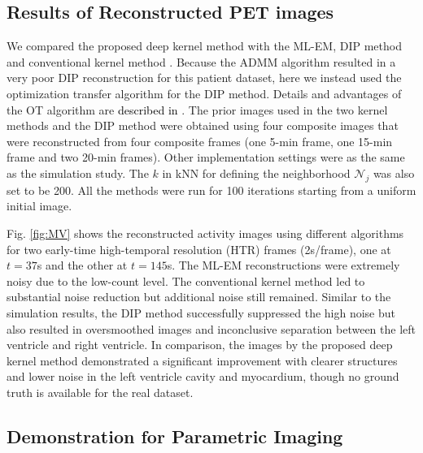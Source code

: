 \documentclass[]{IEEETran}
\newcommand{\txtb}[1]{\textcolor{black}{#1}}
\begin{document}
	\subsection{Results of Reconstructed PET images}
	We compared the proposed deep kernel method with the ML-EM, DIP method\cite{Gong2019} and conventional kernel method \cite{Wang2015}. Because the ADMM algorithm resulted in a very poor DIP reconstruction for this patient dataset, here we instead used the optimization transfer algorithm \cite{Li2022} for the DIP method. Details and advantages of the OT algorithm are \txtb{described in}  \cite{Li2022}. The prior images used in the two kernel methods and the DIP method were obtained using four composite images that were reconstructed from four composite frames (one 5-min frame, one 15-min frame and two 20-min frames).  Other implementation settings were as the same as the simulation study. The $k$ in kNN for defining the neighborhood {$\mathcal{N}_j$} was also set to be 200. All the methods were run for 100 iterations starting from a uniform initial image. 
	
	Fig. \ref{fig:MV} shows the reconstructed activity images using different algorithms for two early-time high-temporal resolution (HTR) frames (2s/frame), one at $t=37$s and the other at $t=145$s. The ML-EM reconstructions were extremely noisy due to the low-count level. The conventional kernel method led to substantial noise reduction but additional noise still remained. Similar to the simulation results, the DIP method successfully suppressed the high noise but also resulted in oversmoothed images and inconclusive separation between the left ventricle and right ventricle. In comparison, the images by the proposed deep kernel method demonstrated a significant improvement with clearer structures and lower noise in the left ventricle cavity and myocardium, though no ground truth is available for the real dataset.
	
	
	\subsection{Demonstration for Parametric Imaging}
	
\end{document}
